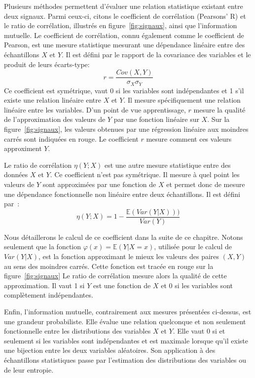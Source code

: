 \documentclass[../main]{subfiles}
\begin{document}
Plusieurs méthodes permettent d'évaluer une relation statistique existant entre deux signaux.
Parmi ceux-ci, citons le coefficient de corrélation (Pearsons' R) et le ratio de corrélation, illustrés en figure~\ref{fig:signaux}, ainsi que l'information mutuelle.
Le coefficient de corrélation, connu également comme le coefficient de Pearson, est une mesure statistique mesurant une dépendance linéaire entre des échantillons $X$ et $Y$. Il est défini par le rapport de la covariance des variables et le produit de leurs écarts-type:
\begin{equation}
    r = \frac{Cov(X,Y)}{\sigma_X \sigma_Y} 
\end{equation}
Ce coefficient est symétrique, vaut 0 si les variables sont indépendantes et 1 s'il existe une relation linéaire entre $X$ et $Y$. Il mesure spécifiquement une relation linéaire entre les variables. 
D'un point de vue apprentissage, $r$ mesure la qualité de l'approximation des valeurs de $Y$ par une fonction linéaire sur $X$. 
Sur la figure~\ref{fig:signaux}, les valeurs obtenues par une régression linéaire aux moindres carrés sont indiquées en rouge. Le coefficient $r$ mesure comment ces valeurs approximent $Y$. 

Le ratio de corrélation $\eta(Y;X)$ est une autre mesure statistique entre des données $X$ et $Y$. Ce coefficient n'est pas symétrique. Il mesure à quel point les valeurs de $Y$ sont approximées par une fonction de $X$ et permet donc de mesure une dépendance fonctionnelle non linéaire entre deux échantillons.
Il est défini par~:
\begin{equation}
    \eta(Y;X) = 1 - \frac{\mathbb{E}(Var(Y|X)))}{Var(Y)}
\end{equation}

Nous détaillerons le calcul de ce coefficient dans la suite de ce chapitre. Notons seulement que la fonction $\varphi(x) = \mathbb{E}(Y|X = x)$, utilisée pour le calcul de $Var(Y|X)$, est la fonction approximant le mieux les valeurs des paires $(X,Y)$ au sens des moindres carrés. Cette fonction est tracée en rouge sur la figure~\ref{fig:signaux}
Le ratio de corrélation mesure alors la qualité de cette approximation. Il vaut 1 si $Y$ est une fonction de $X$ et 0 si les variables sont complètement indépendantes. 

Enfin, l'information mutuelle, contrairement aux mesures présentées ci-dessus, est une grandeur probabiliste.
Elle évalue une relation quelconque et non seulement fonctionnelle entre les distributions des variables $X$ et $Y$. Elle vaut 0 si et seulement si les variables sont indépendantes et est maximale lorsque qu'il existe une bijection entre les deux variables aléatoires.
Son application à des échantillons statistiques passe par l'estimation des distributions des variables ou de leur entropie.
\end{document}
